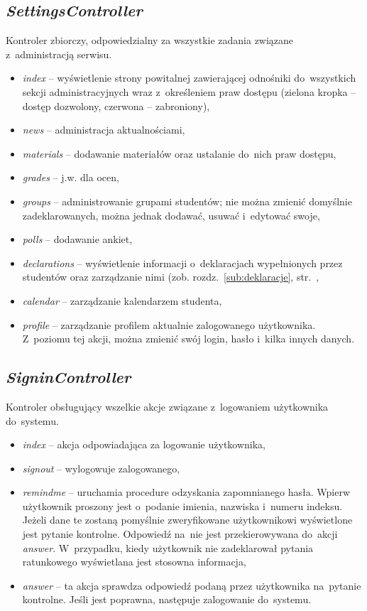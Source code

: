 \documentclass[a4paper,12pt,oneside]{report}
\begin{document}
\subsection{\emph{SettingsController}}
\label{con:settings}
  Kontroler zbiorczy, odpowiedzialny za wszystkie zadania związane z~administracją serwisu.
\begin{itemize}
  \item \emph{index} -- wyświetlenie strony powitalnej zawierającej odnośniki do~wszystkich sekcji administracyjnych wraz z~określeniem praw dostępu (zielona kropka -- dostęp dozwolony, czerwona -- zabroniony),
  \item \emph{news} -- administracja aktualnościami,
  \item \emph{materials} -- dodawanie materiałów oraz ustalanie do~nich praw dostępu,
  \item \emph{grades} -- j.w. dla ocen,
  \item \emph{groups} -- administrowanie grupami studentów; nie można zmienić domyślnie zadeklarowanych, można jednak dodawać, usuwać i~edytować swoje,
  \item \emph{polls} -- dodawanie ankiet,
  \item \emph{declarations} -- wyświetlenie informacji o~deklaracjach wypełnionych przez studentów oraz zarządzanie nimi (zob. rozdz.~\ref{sub:deklaracje}, str.~\pageref{sub:deklaracje},
  \item \emph{calendar} -- zarządzanie kalendarzem studenta,
  \item \emph{profile} -- zarządzanie profilem aktualnie zalogowanego użytkownika. Z~poziomu tej akcji, można zmienić swój login, hasło i~kilka innych danych.
\end{itemize}

\subsection{\emph{SigninController}}
\label{con:signin}
  Kontroler obsługujący wszelkie akcje związane z~logowaniem użytkownika do~systemu.
\begin{itemize}
  \item \emph{index} -- akcja odpowiadająca za logowanie użytkownika,
  \item \emph{signout} -- wylogowuje zalogowanego,
  \item \emph{remindme} -- uruchamia procedure odzyskania zapomnianego hasła. Wpierw użytkownik proszony jest o~podanie imienia, nazwiska i~numeru indeksu. Jeżeli dane te zostaną pomyślnie zweryfikowane użytkownikowi wyświetlone jest pytanie kontrolne. Odpowiedź na~nie jest przekierowywana do~akcji \emph{answer}. W~przypadku, kiedy użytkownik nie zadeklarował pytania ratunkowego wyświetlana jest stosowna informacja,
  \item \emph{answer} -- ta akcja sprawdza odpowiedź podaną przez użytkownika na~pytanie kontrolne. Jeśli jest poprawna, następuje zalogowanie do~systemu.
\end{itemize}
\end{document}
